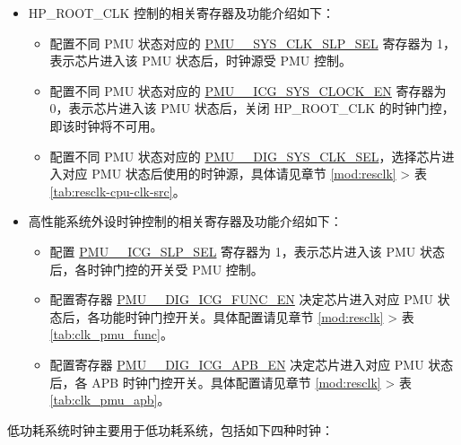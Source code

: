 \documentclass[main\_\_CN.tex]{subfiles}
\begin{document}
\begin{itemize}

\item HP\_ROOT\_CLK 控制的相关寄存器及功能介绍如下：

    \begin{itemize}
    \item 配置不同 PMU 状态对应的 \hyperref[fielddesc:PMUHPACTIVESYSCLKSLPSEL]{PMU\_\_SYS\_CLK\_SLP\_SEL} 寄存器为 1，表示芯片进入该 PMU 状态后，时钟源受 PMU 控制。

    \item 配置不同 PMU 状态对应的 \hyperref[fielddesc:PMUHPACTIVEICGSYSCLOCKEN]{PMU\_\_ICG\_SYS\_CLOCK\_EN} 寄存器为 0，表示芯片进入该 PMU 状态后，关闭 HP\_ROOT\_CLK 的时钟门控，即该时钟将不可用。

    \item 配置不同 PMU 状态对应的 \hyperref[fielddesc:PMUHPACTIVEDIGSYSCLKSEL]{PMU\_\_DIG\_SYS\_CLK\_SEL}，选择芯片进入对应 PMU 状态后使用的时钟源，具体请见章节 \ref{mod:resclk} \textit{} > 表 \ref{tab:resclk-cpu-clk-src}。
    \end{itemize}

\item 高性能系统外设时钟控制的相关寄存器及功能介绍如下：

    \begin{itemize}
    \item 配置 \hyperref[fielddesc:PMUHPACTIVEICGSLPSEL]{PMU\_\_ICG\_SLP\_SEL} 寄存器为 1，表示芯片进入该 PMU 状态后，各时钟门控的开关受 PMU 控制。

    \item 配置寄存器 \hyperref[fielddesc:PMUHPACTIVEDIGICGFUNCEN]{PMU\_\_DIG\_ICG\_FUNC\_EN} 决定芯片进入对应 PMU 状态后，各功能时钟门控开关。具体配置请见章节 \ref{mod:resclk} \textit{} > 表 \ref{tab:clk_pmu_func}。

    \item 配置寄存器 \hyperref[fielddesc:PMUHPACTIVEDIGICGAPBEN]{PMU\_\_DIG\_ICG\_APB\_EN} 决定芯片进入对应 PMU 状态后，各 APB 时钟门控开关。具体配置请见章节 \ref{mod:resclk} \textit{} > 表 \ref{tab:clk_pmu_apb}。
    \end{itemize}

\end{itemize}

低功耗系统时钟主要用于低功耗系统，包括如下四种时钟：
\end{document}
